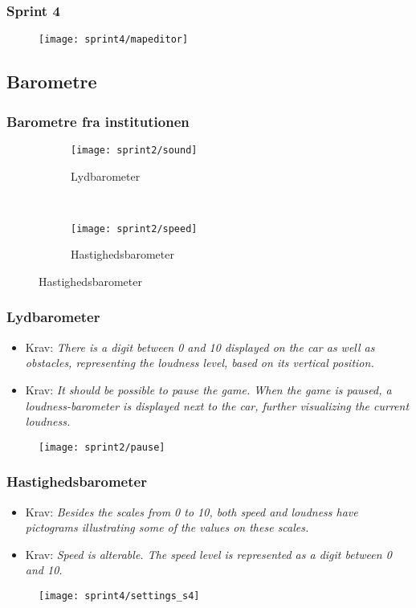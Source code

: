 \begin{frame}
\frametitle{Sprint 4}
\begin{figure}[h]
\texttt{[image: sprint4/mapeditor]}
\end{figure}
\end{frame}

\subsection{Barometre}
\begin{frame}
\frametitle{Barometre fra institutionen}
\begin{figure}[h]
	\centering
        \begin{subfigure}[b]{0.4\textwidth}
                \texttt{[image: sprint2/sound]}
                \caption*{Lydbarometer}
        \end{subfigure}%
        ~
        \begin{subfigure}[b]{0.4\textwidth}
                \texttt{[image: sprint2/speed]}
                \caption*{Hastighedsbarometer}
        \end{subfigure}
\end{figure}
\end{frame}

\begin{frame}
\frametitle{Lydbarometer}
\begin{itemize}
\item Krav: \textit{There is a digit between 0 and 10
displayed on the car as well as obstacles,
representing the loudness level,
based on its vertical position.}
\item Krav: \textit{It should be possible to pause the game.
When the game is paused,
a loudness-barometer is displayed next to the car,
further visualizing the current loudness.}
\end{itemize}
\begin{figure}
\texttt{[image: sprint2/pause]}
\end{figure}
\end{frame}

\begin{frame}
\frametitle{Hastighedsbarometer}
\begin{itemize}
\item Krav: \textit{Besides the scales from 0 to 10,
both speed and loudness have pictograms
illustrating some of the values on these scales.}
\item Krav: \textit{Speed is alterable. The speed level
is represented as a digit between 0 and 10.}
\end{itemize}
\begin{figure}
\texttt{[image: sprint4/settings\_s4]}
\end{figure}
\end{frame}